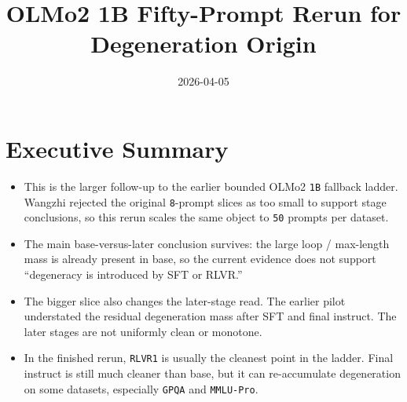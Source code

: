 \documentclass[11pt]{article}
\title{OLMo2 1B Fifty-Prompt Rerun for Degeneration Origin}
\author{}
\date{2026-04-05}
\begin{document}
\maketitle

\section*{Executive Summary}
\begin{itemize}[leftmargin=1.5em]
\item This is the larger follow-up to the earlier bounded OLMo2 \texttt{1B} fallback ladder. Wangzhi rejected the original \texttt{8}-prompt slices as too small to support stage conclusions, so this rerun scales the same object to \texttt{50} prompts per dataset.
\item The main base-versus-later conclusion survives: the large loop / max-length mass is already present in base, so the current evidence does not support ``degeneracy is introduced by SFT or RLVR.''
\item The bigger slice also changes the later-stage read. The earlier pilot understated the residual degeneration mass after SFT and final instruct. The later stages are not uniformly clean or monotone.
\item In the finished rerun, \texttt{RLVR1} is usually the cleanest point in the ladder. Final instruct is still much cleaner than base, but it can re-accumulate degeneration on some datasets, especially \texttt{GPQA} and \texttt{MMLU-Pro}.
\end{itemize}
\end{document}
